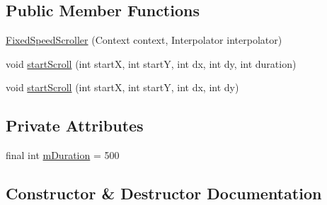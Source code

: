 \subsection*{Public Member Functions}
\begin{DoxyCompactItemize}
\item 
\hyperlink{classorg_1_1buildmlearn_1_1toolkit_1_1flashcardtemplate_1_1widgets_1_1FixedSpeedScroller_ab0e3ff3994ae34b693473ea8d910af28}{Fixed\+Speed\+Scroller} (Context context, Interpolator interpolator)
\item 
void \hyperlink{classorg_1_1buildmlearn_1_1toolkit_1_1flashcardtemplate_1_1widgets_1_1FixedSpeedScroller_a4aeeadf7b1519bf79581c254bac780bc}{start\+Scroll} (int startX, int startY, int dx, int dy, int duration)
\item 
void \hyperlink{classorg_1_1buildmlearn_1_1toolkit_1_1flashcardtemplate_1_1widgets_1_1FixedSpeedScroller_aef075622952444414047034448821b7f}{start\+Scroll} (int startX, int startY, int dx, int dy)
\end{DoxyCompactItemize}
\subsection*{Private Attributes}
\begin{DoxyCompactItemize}
\item 
final int \hyperlink{classorg_1_1buildmlearn_1_1toolkit_1_1flashcardtemplate_1_1widgets_1_1FixedSpeedScroller_ab19e03a2dc903d0592ca7e9168b80ba8}{m\+Duration} = 500
\end{DoxyCompactItemize}


\subsection{Constructor \& Destructor Documentation}
